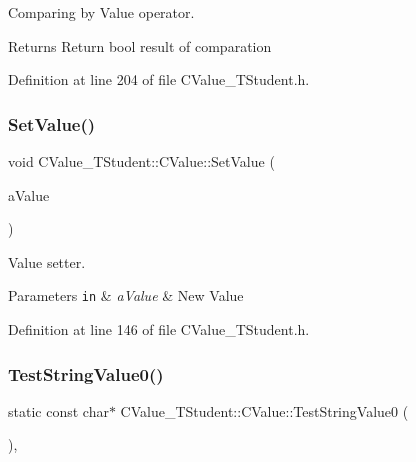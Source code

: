 Comparing by Value operator. 

\begin{DoxyReturn}{Returns}
Return {\ttfamily bool} result of comparation 
\end{DoxyReturn}


Definition at line 204 of file C\+Value\+\_\+\+T\+Student.\+h.

\mbox{\label{class_c_value___t_student_1_1_c_value_a1fcbd9b398c97c4365de889a533c90e1}} 
\subsubsection{\texorpdfstring{Set\+Value()}{SetValue()}}
{\footnotesize\ttfamily void C\+Value\+\_\+\+T\+Student\+::\+C\+Value\+::\+Set\+Value (\begin{DoxyParamCaption}\item[{const \hyperlink{struct_c_value___t_student_1_1_t_student}{T\+Student}}]{a\+Value }\end{DoxyParamCaption})\hspace{0.3cm}{\ttfamily [inline]}}



Value setter. 


\begin{DoxyParams}[1]{Parameters}
\mbox{\tt in}  & {\em a\+Value} & New Value \\
\hline
\end{DoxyParams}


Definition at line 146 of file C\+Value\+\_\+\+T\+Student.\+h.

\mbox{\label{class_c_value___t_student_1_1_c_value_a7a3fba914631fd789942450660718a32}} 
\subsubsection{\texorpdfstring{Test\+String\+Value0()}{TestStringValue0()}}
{\footnotesize\ttfamily static const char$\ast$ C\+Value\+\_\+\+T\+Student\+::\+C\+Value\+::\+Test\+String\+Value0 (\begin{DoxyParamCaption}{ }\end{DoxyParamCaption})\hspace{0.3cm}{\ttfamily [inline]}, {\ttfamily [static]}}



